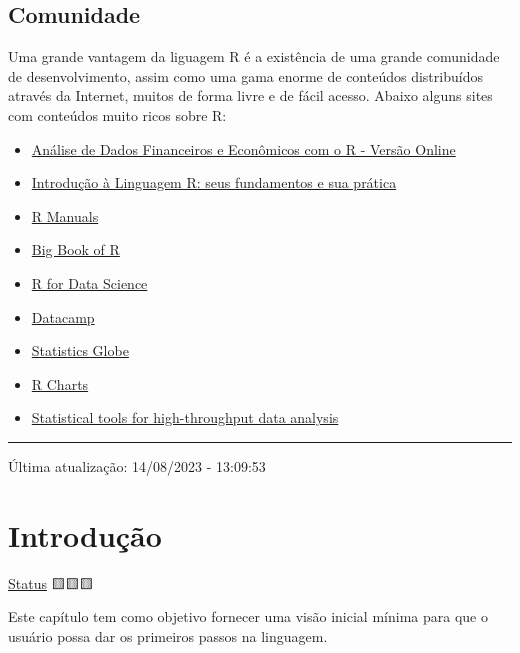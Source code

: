\documentclass[
  letterpaper,
  DIV=11,
  numbers=noendperiod]{scrreprt}
\begin{document}
\hypertarget{comunidade}{%
\section*{Comunidade}\label{comunidade}}


Uma grande vantagem da liguagem R é a existência de uma grande
comunidade de desenvolvimento, assim como uma gama enorme de conteúdos
distribuídos através da Internet, muitos de forma livre e de fácil
acesso. Abaixo alguns sites com conteúdos muito ricos sobre R:

\begin{itemize}
\item
  \href{https://msperlin.com/adfer/}{Análise de Dados Financeiros e
  Econômicos com o R - Versão Online}
\item
  \href{https://pedropark99.github.io/Introducao_R/}{Introdução à
  Linguagem R: seus fundamentos e sua prática}
\item
  \href{https://rstudio.github.io/r-manuals/}{R Manuals}
\item
  \href{https://www.bigbookofr.com/}{Big Book of R}
\item
  \href{https://r4ds.hadley.nz/}{R for Data Science}
\item
  \href{https://www.datacamp.com/}{Datacamp}
\item
  \href{https://statisticsglobe.com/}{Statistics Globe}
\item
  \href{https://r-charts.com/}{R Charts}
\item
  \href{http://www.sthda.com/english/}{Statistical tools for
  high-throughput data analysis}
\end{itemize}

\begin{center}\rule{0.5\linewidth}{0.5pt}\end{center}

Última atualização: 14/08/2023 - 13:09:53

\hypertarget{introduuxe7uxe3o}{%
\chapter{Introdução}\label{introduuxe7uxe3o}}

\protect\hyperlink{status-do-material}{Status} 🟨🟨🟨

Este capítulo tem como objetivo fornecer uma visão inicial mínima para
que o usuário possa dar os primeiros passos na linguagem.
\end{document}
